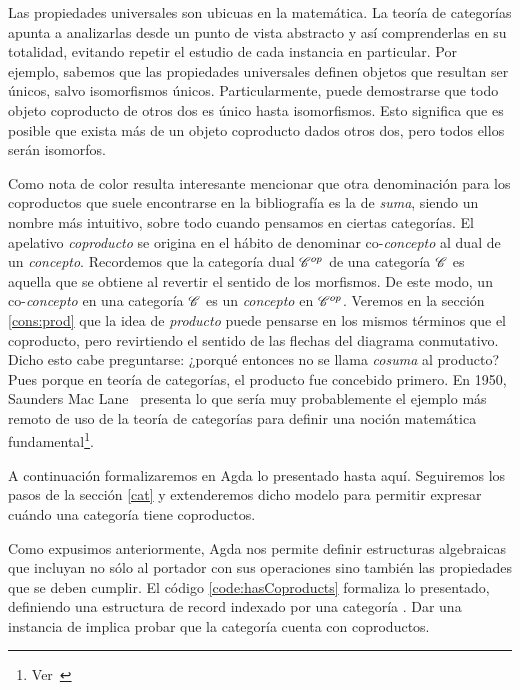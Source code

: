 Las propiedades universales son ubicuas en la matemática. La teoría de categorías apunta a analizarlas desde un punto de vista abstracto y así comprenderlas en su totalidad, evitando repetir el estudio de cada instancia en particular. Por ejemplo, sabemos que las propiedades universales definen objetos que resultan ser únicos, salvo isomorfismos únicos. Particularmente, puede demostrarse que todo objeto coproducto de otros dos es único hasta isomorfismos. Esto significa que es posible que exista más de un objeto coproducto dados otros dos, pero todos ellos serán isomorfos. 

\vspace{3ex}

Como nota de color resulta interesante mencionar que otra denominación para los coproductos que suele encontrarse en la bibliografía es la de {\it suma}, siendo un nombre más intuitivo, sobre todo cuando pensamos en ciertas categorías. El apelativo {\it coproducto} se origina en el hábito de denominar co-{\it concepto} al dual de un {\it concepto}. Recordemos que la categoría dual $\mathscr{C}^{op}$ de una categoría $\mathscr{C}$ es aquella que se obtiene al revertir el sentido de los morfismos. De este modo, un co-{\it concepto} en una categoría $\mathscr{C}$ es un {\it concepto} en $\mathscr{C}^{op}$. Veremos en la sección \ref{cons:prod} que la idea de {\it producto} puede pensarse en los mismos términos que el coproducto, pero revirtiendo el sentido de las flechas del diagrama conmutativo. Dicho esto cabe preguntarse: ¿porqué entonces no se llama {\it cosuma} al producto? Pues porque en teoría de categorías, el producto fue concebido primero. En 1950, Saunders Mac Lane~\cite{maclane1950} presenta lo que sería muy probablemente el ejemplo más remoto de uso de la teoría de categorías para definir una noción matemática fundamental\footnote{Ver~\cite{Awodey}}. 

\vspace{3ex}

A continuación formalizaremos en Agda lo presentado hasta aquí. Seguiremos los pasos de la sección \ref{cat} y extenderemos dicho modelo para permitir expresar cuándo una categoría tiene coproductos.

Como expusimos anteriormente, Agda nos permite definir estructuras algebraicas que incluyan no sólo al portador con sus operaciones sino también las propiedades que se deben cumplir.
El código \ref{code:hasCoproducts} formaliza lo presentado, definiendo una estructura de record indexado por una categoría \AgdaBound{\C}. Dar una instancia de  \AgdaBound{\C} implica probar que la categoría \AgdaBound{\C} cuenta con coproductos.

